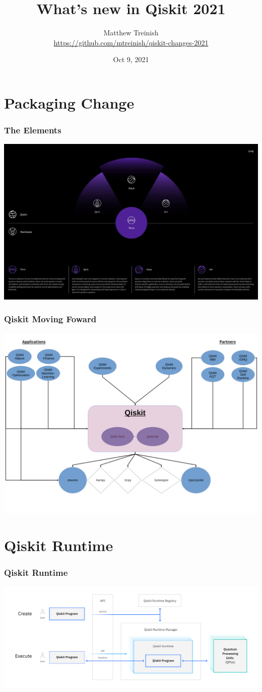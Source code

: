 \documentclass[aspectratio=169,11pt,hyperref={colorlinks=true}]{beamer}
\author[Matthew Treinish]{%
    \texorpdfstring{%
        \centering
        Matthew Treinish\\
        \href{https://github.com/mtreinish/qiskit-changes-2021}{https://github.com/mtreinish/qiskit-changes-2021}
   }
   {Matthew Treinish}
}
\date{Oct 9, 2021}
\title{What's new in Qiskit 2021}
\begin{document}
\titlepage

\section{Packaging Change}
\begin{frame}
    \frametitle{The Elements}
    \centering
    \includegraphics[width=.99\textwidth]{qiskit-components.jpeg}
\end{frame}

\begin{frame}
    \frametitle{Qiskit Moving Foward}
    \centering
    \includegraphics[width=.9\textwidth]{new_qiskit.png}
\end{frame}

\section{Qiskit Runtime}
\begin{frame}
    \frametitle{Qiskit Runtime}
    \centering
    \includegraphics[width=.99\textwidth]{qiskit-runtime.png}
\end{frame}
\end{document}
